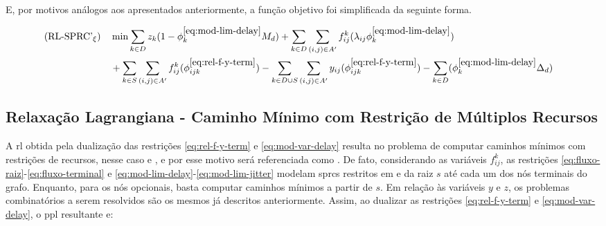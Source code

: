 E, por  motivos análogos aos  apresentados anteriormente, a função  objetivo foi
simplificada da seguinte forma.

\begin{align}
(\text{RL-SPRC'}_{\xi}) \quad 
  & \nonumber \displaystyle \min \sum_{k \in D}z_k (1 - \phi^{\ref{eq:mod-lim-delay}}_{k}M_d) + \sum_{k \in D} \sum_{(i, j) \in A'} f_{ij}^{k} (\lambda_{ij} \phi^{\ref{eq:mod-lim-delay}}_{k}) & \\
  & \displaystyle + \sum_{k \in S} \sum_{(i, j) \in A'} f_{ij}^{k}(\phi^{\ref{eq:rel-f-y-term}}_{ijk}) - \sum_{k \in D \cup S} \sum_{(i, j) \in A'} y_{ij}(\phi^{\ref{eq:rel-f-y-term}}_{ijk}) - \sum_{k \in D} (\phi^{\ref{eq:mod-lim-delay}}_{k} \Delta_d) & \label{eq:fo-sprc-jitter-weaker}
\end{align} 

\subsection{Relaxação Lagrangiana - Caminho Mínimo com Restrição de Múltiplos Recursos} \label{subsec:rl-cshp2}

A  \gls{rl}  obtida pela  dualização  das  restrições \eqref{eq:rel-f-y-term}  e
\eqref{eq:mod-var-delay} resulta  no problema  de computar caminhos  mínimos com
restrições de recursos, nesse caso {\delay}  e {\jitter}, e por esse motivo será
referenciada como  {\rlq}. De fato,  considerando as variáveis  $f_{ij}^{k}$, as
restrições           \eqref{eq:fluxo-raiz}-\eqref{eq:fluxo-terminal}           e
\eqref{eq:mod-lim-delay}-\eqref{eq:mod-lim-jitter} modelam \gls{sprc}s restritos
em {\delay}  e {\jitter} da  raiz $s$  até cada um  dos nós terminais  do grafo.
Enquanto, para  os nós opcionais,  basta computar  caminhos mínimos a  partir de
$s$.  Em relação  às variáveis  $y$ e  $z$, os  problemas combinatórios  a serem
resolvidos  são os  mesmos já  descritos  anteriormente. Assim,  ao dualizar  as
restrições  \eqref{eq:rel-f-y-term}  e   \eqref{eq:mod-var-delay},  o  \gls{ppl}
resultante e:

